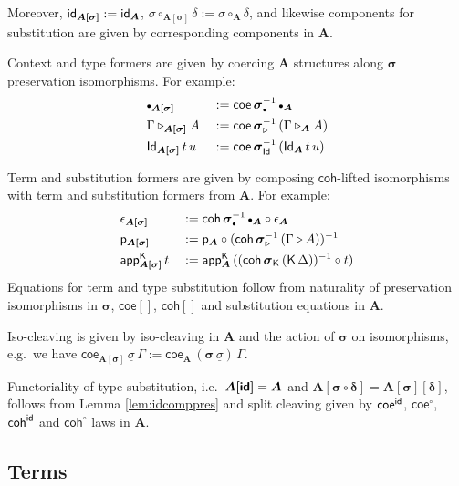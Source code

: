 \documentclass[sigplan,review,anonymous]{acmart}\settopmatter{printfolios=true,printccs=false,printacmref=false}
\newcommand{\ext}{\triangleright}
\newcommand{\emptycon}{\scaleobj{.75}\bullet}
\newcommand{\p}{\mathsf{p}}
\newcommand{\appK}{\mathsf{app}^{\K}}
\newcommand{\bsigma}{\boldsymbol{\sigma}}
\newcommand{\bA}{\boldsymbol{A}}
\newcommand{\ul}[1]{\underline{#1}}
\newcommand{\ulsigma}{\ul{\sigma}}
\newcommand{\coe}{\mathsf{coe}}
\newcommand{\coh}{\mathsf{coh}}
\begin{document}
Moreover, $\id_{\boldsymbol{A[\sigma]}} := \id_{\bA}$,
$\sigma\circ_{\boldsymbol{A[\sigma]}}\delta := \sigma\circ_{\bA}\delta$, and
likewise components for substitution are given by corresponding components in
$\bA$.

Context and type formers are given by coercing $\bA$
structures along $\bsigma$ preservation isomorphisms. For example:
\begin{alignat*}{3}
  &\emptycon_{\boldsymbol{A[\sigma]}} && :=
    \coe\,\bsigma_{\emptycon}^{-1}\,\emptycon_{\bA}\\
  &\Gamma\ext_{\boldsymbol{A[\sigma]}}A && :=
    \coe\,\bsigma_{\ext}^{-1}\,(\Gamma\ext_{\bA} A)\\
  &\Id_{\boldsymbol{A[\sigma]}}\,t\,u && :=
    \coe\,\bsigma_{\Id}^{-1}\,(\Id_{\bA}\,t\,u)
\end{alignat*}

Term and substitution formers are given by composing $\coh$-lifted
isomorphisms with term and substitution formers from $\bA$. For example:
\begin{alignat*}{3}
  & \epsilon_{\boldsymbol{A[\sigma]}} && :=
    \coh\,\bsigma_{\emptycon}^{-1}\,\emptycon_{\bA} \circ \epsilon_{\bA}\\
  & \p_{\boldsymbol{A[\sigma]}} && :=
    \p_{\bA} \circ (\coh\,\bsigma_{\ext}^{-1}\,(\Gamma\ext A))^{-1}\\
  & \appK_{\boldsymbol{A[\sigma]}}\,t && :=
    \appK_{\bA}\,((\coh\,\bsigma_{\K}\,(\K\,\Delta))^{-1}\circ t)
\end{alignat*}
Equations for term and type substitution follow from naturality of preservation
isomorphisms in $\bsigma$, $\coe[]$, $\coh[]$ and substitution equations in
$\bA$.

Iso-cleaving is given by iso-cleaving in $\bA$ and the action of $\bsigma$ on
isomorphisms, e.g.\ we have $\coe_{\boldsymbol{A[\sigma]}}\,\ulsigma\,\Gamma
:= \coe_{\bA}\,(\bsigma\,\ulsigma)\,\Gamma$.

Functoriality of type substitution, i.e.\ $\boldsymbol{A[\id]} = \bA$ and
$\boldsymbol{A[\sigma\circ\delta]} = \boldsymbol{A[\sigma][\delta]}$, follows
from Lemma \ref{lem:idcomppres} and split cleaving given by $\coe^{\id}$,
$\coe^{\circ}$, $\coh^{\id}$ and $\coh^{\circ}$ laws in $\bA$.

\subsection{Terms}
\end{document}
